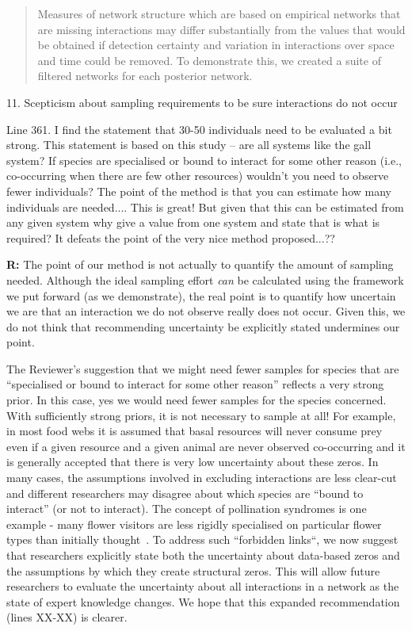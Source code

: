 \documentclass[12pt]{letter}
\newenvironment{refquote}{\bigskip \begin{it}}{\end{it}\smallskip}
\begin{document}
		\begin{quotation}
			Measures of network structure which are based on empirical networks that are missing interactions may differ substantially from the values that would be obtained if detection certainty and variation in interactions over space and time could be removed. To demonstrate this, we created a suite of filtered networks for each posterior network. 
		\end{quotation}


	11. Scepticism about sampling requirements to be sure interactions do not occur 


		\begin{refquote}
		Line 361.  I find the statement that 30-50 individuals need to be evaluated a bit strong.  This statement is based on this study – are all systems like the gall system?  If species are specialised or bound to interact for some other reason (i.e., co-occurring when there are few other resources) wouldn't you need to observe fewer individuals?  The point of the method is that you can estimate how many individuals are needed.... This is great!  But given that this can be estimated from any given system why give a value from one system and state that is what is required?  It defeats the point of the very nice method proposed...??
		\end{refquote}


		\textbf{R:} The point of our method is not actually to quantify the amount of sampling needed. Although the ideal sampling effort \emph{can} be calculated using the framework we put forward (as we demonstrate), the real point is to quantify how uncertain we are that an interaction we do not observe really does not occur. Given this, we do not think that recommending uncertainty be explicitly stated undermines our point. 


		The Reviewer's suggestion that we might need fewer samples for species that are ``specialised or bound to interact for some other reason'' reflects a very strong prior. In this case, yes we would need fewer samples for the species concerned. With sufficiently strong priors, it is not necessary to sample at all! For example, in most food webs it is assumed that basal resources will never consume prey even if a given resource and a given animal are never observed co-occurring and it is generally accepted that there is very low uncertainty about these zeros. In many cases, the assumptions involved in excluding interactions are less clear-cut and different researchers may disagree about which species are ``bound to interact'' (or not to interact). The concept of pollination syndromes is one example - many flower visitors are less rigidly specialised on particular flower types than initially thought~\citep{Ollerton2009}. To address such ``forbidden links``, we now suggest that researchers explicitly state both the uncertainty about data-based zeros and the assumptions by which they create structural zeros. This will allow future researchers to evaluate the uncertainty about all interactions in a network as the state of expert knowledge changes. We hope that this expanded recommendation (lines XX-XX) is clearer.
\end{document}
